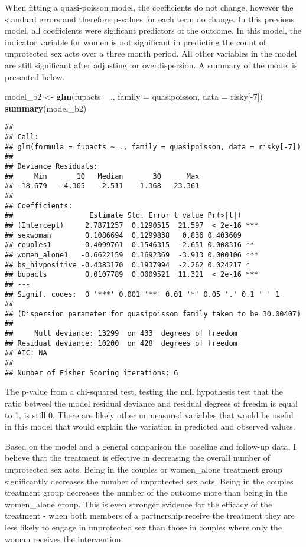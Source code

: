 \documentclass[]{article}
\newenvironment{Shaded}{\begin{snugshade}}{\end{snugshade}}
\newcommand{\KeywordTok}[1]{\textcolor[rgb]{0.13,0.29,0.53}{\textbf{{#1}}}}
\newcommand{\DataTypeTok}[1]{\textcolor[rgb]{0.13,0.29,0.53}{{#1}}}
\newcommand{\DecValTok}[1]{\textcolor[rgb]{0.00,0.00,0.81}{{#1}}}
\newcommand{\StringTok}[1]{\textcolor[rgb]{0.31,0.60,0.02}{{#1}}}
\newcommand{\NormalTok}[1]{{#1}}
\begin{document}
When fitting a quasi-poisson model, the coefficients do not change,
however the standard errors and therefore p-values for each term do
change. In this previous model, all coefficients were sigificant
predictors of the outcome. In this model, the indicator variable for
women is not significant in predicting the count of unprotected sex acts
over a three month period. All other variables in the model are still
significant after adjusting for overdispersion. A summary of the model
is presented below.

\begin{Shaded}
\begin{Highlighting}[]
\NormalTok{model_b2 <-}\StringTok{ }\KeywordTok{glm}\NormalTok{(fupacts ~}\StringTok{ }\NormalTok{., }\DataTypeTok{family =} \NormalTok{quasipoisson, }\DataTypeTok{data =} \NormalTok{risky[-}\DecValTok{7}\NormalTok{])}
\KeywordTok{summary}\NormalTok{(model_b2)}
\end{Highlighting}
\end{Shaded}

\begin{verbatim}
## 
## Call:
## glm(formula = fupacts ~ ., family = quasipoisson, data = risky[-7])
## 
## Deviance Residuals: 
##     Min       1Q   Median       3Q      Max  
## -18.679   -4.305   -2.511    1.368   23.361  
## 
## Coefficients:
##                  Estimate Std. Error t value Pr(>|t|)    
## (Intercept)     2.7871257  0.1290515  21.597  < 2e-16 ***
## sexwoman        0.1086694  0.1299838   0.836 0.403609    
## couples1       -0.4099761  0.1546315  -2.651 0.008316 ** 
## women_alone1   -0.6622159  0.1692369  -3.913 0.000106 ***
## bs_hivpositive -0.4383170  0.1937994  -2.262 0.024217 *  
## bupacts         0.0107789  0.0009521  11.321  < 2e-16 ***
## ---
## Signif. codes:  0 '***' 0.001 '**' 0.01 '*' 0.05 '.' 0.1 ' ' 1
## 
## (Dispersion parameter for quasipoisson family taken to be 30.00407)
## 
##     Null deviance: 13299  on 433  degrees of freedom
## Residual deviance: 10200  on 428  degrees of freedom
## AIC: NA
## 
## Number of Fisher Scoring iterations: 6
\end{verbatim}

The p-value from a chi-squared test, testing the null hypothesis test
that the ratio betweel the model residual deviance and residual degrees
of freedm is equal to 1, is still 0. There are likely other unmeasured
variables that would be useful in this model that would explain the
variation in predicted and observed values.

Based on the model and a general comparison the baseline and follow-up
data, I believe that the treatment is effective in decreasing the
overall number of unprotected sex acts. Being in the couples or
women\_alone treatment group significantly decreases the number of
unprotected sex acts. Being in the couples treatment group decreases the
number of the outcome more than being in the women\_alone group. This is
even stronger evidence for the efficacy of the treatment - when both
members of a partnership receive the treatment they are less likely to
engage in unprotected sex than those in couples where only the woman
receives the intervention.
\end{document}
